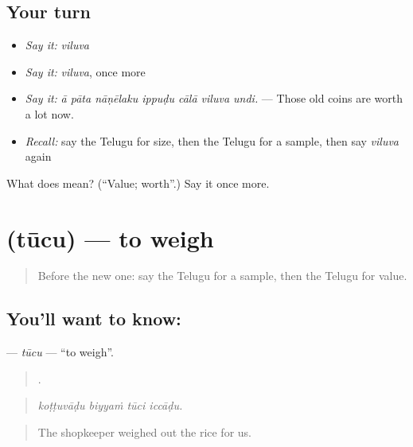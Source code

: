 \subsection*{Your turn}
\begin{itemize}
\raggedright
  \item \emph{Say it:} \emph{viluva}
  \item \emph{Say it:} \emph{viluva}, once more
  \item \emph{Say it:} \emph{ā pāta nāṇēlaku ippuḍu cālā viluva undi.} — Those old coins are worth a lot now.
  \item \emph{Recall:} say the Telugu for size, then the Telugu for a sample, then say \emph{viluva} again
\end{itemize}

\begin{tcolorbox}[breakable,colback=teal!4,colframe=teal!35!black,title={Before you move on}]
What does  mean? (\textquotedblleft{}Value; worth\textquotedblright{}.) Say it once more.
\end{tcolorbox}
\section[\texorpdfstring{\te{తూచు} (tūcu)}{తూచు (tūcu)}]{ (tūcu) — to weigh}

\label{lesson:TE-C486-tucu}



\begin{quote}
Before the new one: say the Telugu for a sample, then the Telugu for value.
\end{quote}

\subsection*{You'll want to know: }
\textbf{} — \emph{tūcu} — \textquotedblleft{}to weigh\textquotedblright{}.

\begin{quote}
   .
\end{quote}

\begin{quote}
\emph{koṭṭuvāḍu biyyaṁ tūci iccāḍu.}
\end{quote}

\begin{quote}
The shopkeeper weighed out the rice for us.
\end{quote}

